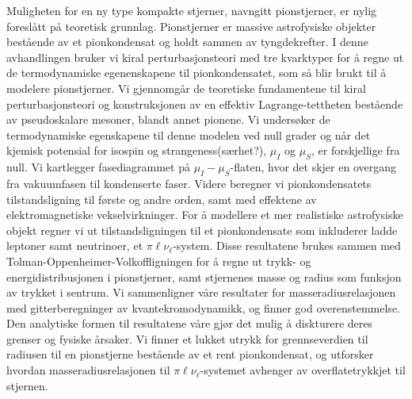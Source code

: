Muligheten for en ny type kompakte stjerner, navngitt pionstjerner, er nylig foreslått på teoretisk grunnlag.
Pionstjerner er massive astrofysiske objekter bestående av et pionkondensat og holdt sammen av tyngdekrefter.
I denne avhandlingen bruker vi kiral perturbasjonsteori med tre kvarktyper for å regne ut de termodynamiske egenenskapene til pionkondensatet, som så blir brukt til å modelere pionstjerner.
Vi gjennomgår de teoretiske fundamentene til kiral perturbasjonsteori og konstruksjonen av en effektiv Lagrange-tettheten bestående av pseudoskalare mesoner, blandt annet pionene.
Vi undersøker de termodynamiske egenskapene til denne modelen ved null grader og når det kjemisk potensial for isospin og strangeness(særhet?), $\mu_I$ og $\mu_S$, er forskjellige fra null.
Vi kartlegger fasediagrammet på $\mu_I-\mu_S$-flaten, hvor det skjer en overgang fra vakuumfasen til kondenserte faser.
Videre beregner vi pionkondensatets tilstandsligning til første og andre orden, samt med effektene av elektromagnetiske vekselvirkninger.
For å modellere et mer realistiske astrofysiske objekt regner vi ut tilstandsligningen til et pionkondensate som inkluderer ladde leptoner samt neutrinoer, et $\pi\ell\nu_\ell$-system.
Disse resultatene brukes sammen med Tolman-Oppenheimer-Volkoffligningen for å regne ut trykk- og energidistribusjonen i pionstjerner, samt stjernenes masse og radius som funksjon av trykket i sentrum.
Vi sammenligner våre resultater for masseradiusrelasjonen med gitterberegninger av kvantekromodynamikk, og finner god overenstemmelse.
Den analytiske formen til resultatene våre gjør det mulig å diskturere deres grenser og fysiske årsaker.
Vi finner et lukket utrykk for grennseverdien til radiusen til en pionstjerne bestående av et rent pionkondensat, og utforsker hvordan masseradiusrelasjonen til $\pi\ell\nu_\ell$-systemet avhenger av overflatetrykkjet til stjernen.

